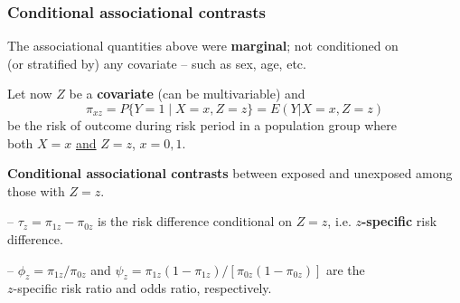 \documentclass[12pt,dvipsnames,t,aspectratio=169, handout%
]{beamer}
\begin{document}
\begin{frame}
\frametitle{\large Conditional associational contrasts}

\bi
\item
The associational quantities above were \textbf{marginal}; 
not conditioned on \\ (or stratified by) any {covariate} -- such as sex, age, etc.
\pause
\medskip
\item
Let now $Z$ be a {\bf covariate} (can be multivariable)  and
$$ \pi_{xz} = P\{ Y=1 \mid  X=x, Z=z \} = E(Y|X=x, Z=z) $$  
be the risk of outcome during risk period in a population group where \\
both $X=x$ \underline{and} $Z=z$, $x=0,1$.
\pause
\medskip
\item
 {\bf Conditional associational contrasts} 
between exposed and unexposed among those with $Z=z$.
\bi
{\normalsize
\item[--]
  $ \tau_z = \pi_{1z} - \pi_{0z}$ is the risk difference conditional on $Z=z$, i.e. {\bf $z$-specific} risk difference. 
\pause	
\medskip
\item[--]
$\phi_z = \pi_{1z}/\pi_{0z}$ and $\psi_z = \pi_{1z}(1-\pi_{1z})/[\pi_{0z}(1 - \pi_{0z})]$ are the  \\ $z$-specific risk ratio and odds ratio, respectively.
}
\ei

\ei 
\end{frame}
\end{document}
